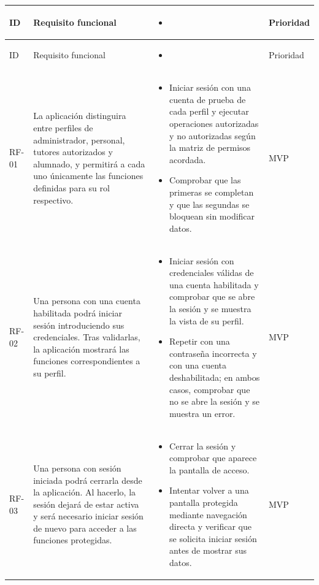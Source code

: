 \begingroup
\small
\newcommand{\criterioinicio}{\begin{itemize}[nosep,leftmargin=*]\item\raggedright}
\newcommand{\criteriofin}{\end{itemize}}
\begin{longtable}{|>{\raggedright\arraybackslash}p{1cm}|>{\raggedright\arraybackslash}p{6cm}|>{\criterioinicio}p{5.9cm}<{\criteriofin}|>{\centering\arraybackslash}p{1.8cm}|}
\hline
\rowcolor{tableHeader}
ID & \textcolor{cambioCatalogo}{Requisito funcional} & \multicolumn{1}{|>{\raggedright\arraybackslash}p{5.9cm}|}{Criterio de aceptación} & Prioridad \\
\hline
\endfirsthead
\rowcolor{tableHeader}
ID & \textcolor{cambioCatalogo}{Requisito funcional} & \multicolumn{1}{|>{\raggedright\arraybackslash}p{5.9cm}|}{Criterio de aceptación} & Prioridad \\
\hline
\endhead
\hypertarget{rf-01}{}RF-01 & La aplicación distinguira entre perfiles de administrador, personal, tutores autorizados y alumnado, y permitirá a cada uno únicamente las funciones definidas para su rol respectivo. & Iniciar sesión con una cuenta de prueba de cada perfil y ejecutar operaciones autorizadas y no autorizadas según la matriz de permisos acordada. \item Comprobar que las primeras se completan y que las segundas se bloquean sin modificar datos. & MVP \\
\hline
\hypertarget{rf-02}{}RF-02 & Una persona con una cuenta habilitada podrá iniciar sesión introduciendo sus credenciales. Tras validarlas, la aplicación mostrará las funciones correspondientes a su perfil. & Iniciar sesión con credenciales válidas de una cuenta habilitada y comprobar que se abre la sesión y se muestra la vista de su perfil. \item Repetir con una contraseña incorrecta y con una cuenta deshabilitada; en ambos casos, comprobar que no se abre la sesión y se muestra un error. & MVP \\
\hline
\hypertarget{rf-03}{}RF-03 & Una persona con sesión iniciada podrá cerrarla desde la aplicación. Al hacerlo, la sesión dejará de estar activa y será necesario iniciar sesión de nuevo para acceder a las funciones protegidas. & Cerrar la sesión y comprobar que aparece la pantalla de acceso. \item Intentar volver a una pantalla protegida mediante navegación directa y verificar que se solicita iniciar sesión antes de mostrar sus datos. & MVP \\

\end{longtable}
